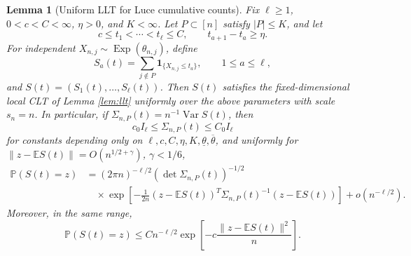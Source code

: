 \documentclass[11pt]{article}
\newtheorem{lemma}[theorem]{Lemma}
\theoremstyle{remark}
\newcommand{\Pp}{\mathbb P}
\newcommand{\Ee}{\mathbb E}
\newcommand{\one}{\mathbf 1}
\newcommand{\Exp}{\operatorname{Exp}}
\newcommand{\Var}{\operatorname{Var}}
\begin{document}
\begin{lemma}[Uniform LLT for Luce cumulative counts]\label{lem:luce-cumulative-llt}
Fix \(\ell\ge1\), \(0<c<C<\infty\), \(\eta>0\), and \(K<\infty\).  Let \(P\subset[n]\) satisfy \(|P|\le K\), and let
\[
        c\le t_1<\cdots<t_\ell\le C,
        \qquad t_{a+1}-t_a\ge \eta .
\]
For independent \(X_{n,j}\sim\Exp(\theta_{n,j})\), define
\[
        S_a(t)=\sum_{j\notin P}\one_{\{X_{n,j}\le t_a\}},
        \qquad 1\le a\le\ell,
\]
and \(S(t)=(S_1(t),\ldots,S_\ell(t))\).  Then \(S(t)\) satisfies the fixed-dimensional local CLT of Lemma \ref{lem:llt} uniformly over the above parameters with scale \(s_n=n\).  In particular, if \(\Sigma_{n,P}(t)=n^{-1}\Var S(t)\), then
\[
        c_0 I_\ell\le \Sigma_{n,P}(t)\le C_0 I_\ell
\]
for constants depending only on \(\ell,c,C,\eta,K,\underline\theta,\overline\theta\), and uniformly for
\(\|z-\Ee S(t)\|=O(n^{1/2+\gamma})\), \(\gamma<1/6\),
\[
\begin{aligned}
        \Pp(S(t)=z)
        &=(2\pi n)^{-\ell/2}(\det\Sigma_{n,P}(t))^{-1/2} \\
        &\quad\times
        \exp\left[-\frac1{2n}(z-\Ee S(t))^T\Sigma_{n,P}(t)^{-1}(z-\Ee S(t))\right]
        +o(n^{-\ell/2}).
\end{aligned}
\]
Moreover, in the same range,
\[
        \Pp(S(t)=z)
        \le C n^{-\ell/2}
        \exp\left[-c\frac{\|z-\Ee S(t)\|^2}{n}\right].
\]
\end{lemma}
\end{document}
